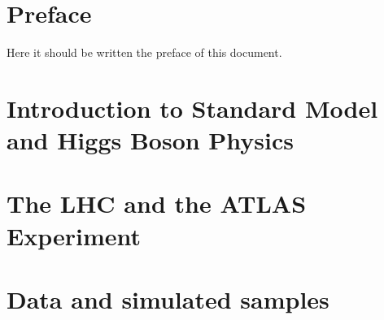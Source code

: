 \documentclass[11pt,twoside]{book}
\begin{document}
\pagestyle{empty}


\cleardoublepage

\pagestyle{fancy}


\hypersetup{linkcolor=black}
\tableofcontents
\clearpage
\hypersetup{linkcolor=blue}


\clearpage



\newpage

\setlength{\parindent}{15pt} %
\setlength{\parskip}{1.2mm plus 0.1mm} %

\chapter*{Preface}
\label{chap:preface}

Here it should be written the preface of this document.



\chapter{Introduction to Standard Model and Higgs Boson Physics}
\label{chap:intro}


\chapter{The LHC and the ATLAS Experiment}
\label{chap:ATLAS}


\chapter{Data and simulated samples}
\label{chap:dataset}

\end{document}
